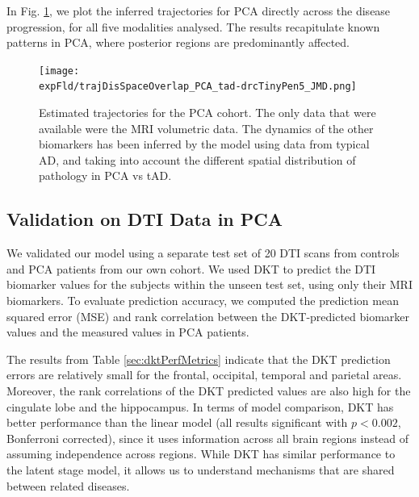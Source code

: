 \documentclass{llncs}
\begin{document}
In Fig. \ref{fig:PCAtrajByModality}, we plot the inferred trajectories for PCA directly across the disease progression, for all five modalities analysed. The results recapitulate known patterns in PCA, where posterior regions are predominantly affected.


\begin{figure}[htp]
\centering
 \texttt{[image: \\expFld/trajDisSpaceOverlap\_PCA\_tad-drcTinyPen5\_JMD.png]}
 \caption{Estimated trajectories for the PCA cohort. The only data that were available were the MRI volumetric data. The dynamics of the other biomarkers has been inferred by the model using data from typical AD, and taking into account the different spatial distribution of pathology in PCA vs tAD.}
 \label{fig:PCAtrajByModality}
\end{figure}


\subsection{Validation on DTI Data in PCA}
\label{sec:dktResVal}

We validated our model using a separate test set of 20 DTI scans from controls and PCA patients from our own cohort. We used DKT to predict the DTI biomarker values for the subjects within the unseen test set, using only their MRI biomarkers. To evaluate prediction accuracy, we computed the prediction mean squared error (MSE) and rank correlation between the DKT-predicted biomarker values and the measured values in PCA patients. 


The results from Table \ref{sec:dktPerfMetrics} indicate that the DKT prediction errors are relatively small for the frontal, occipital, temporal and parietal areas. Moreover, the rank correlations of the DKT predicted values are also high for the cingulate lobe and the hippocampus. In terms of model comparison, DKT has better performance than the linear model (all results significant with $p < 0.002$, Bonferroni corrected), since it uses information across all brain regions instead of assuming independence across regions. While DKT has similar performance to the latent stage model, it allows us to understand mechanisms that are shared between related diseases. 
\end{document}
